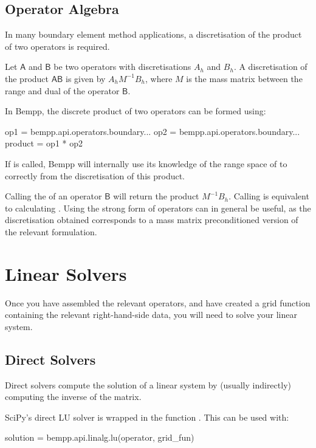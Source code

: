 \documentclass[a4paper]{book}
\begin{document}
\section{Operator Algebra}

In many boundary element method applications, a discretisation of the product of two operators
is required.

Let $\mathsf{A}$ and $\mathsf{B}$ be two operators with discretisations $A_h$ and $B_h$.
A discretisation of the product $\mathsf{A}\mathsf{B}$ is given by $A_hM^{-1}B_h$,
where $M$ is the mass matrix between the range and dual of the operator $\mathsf{B}$.

In Bempp, the discrete product of two operators can be formed using:
\begin{python}
op1 = bempp.api.operators.boundary...
op2 = bempp.api.operators.boundary...
product = op1 * op2
\end{python}
If  is called, Bempp will internally use its knowledge of the range space
of  to correctly from the discretisation of this product.

Calling the  of an operator $\mathsf{B}$ will return the product
$M^{-1}B_h$. Calling  is equivalent to calculating
. Using the strong form of operators can in general
be useful, as the discretisation obtained corresponds to a mass matrix preconditioned
version of the relevant formulation.


\chapter{Linear Solvers}


Once you have assembled the relevant operators, and have created a grid function containing
the relevant right-hand-side data, you will need to solve your linear system.


\section{Direct Solvers}


Direct solvers compute the solution of a linear system by (usually indirectly) computing the
inverse of the matrix.

SciPy's direct LU solver is wrapped in the function . This can be used with:
\begin{python}
solution = bempp.api.linalg.lu(operator, grid_fun)
\end{python}
\end{document}
